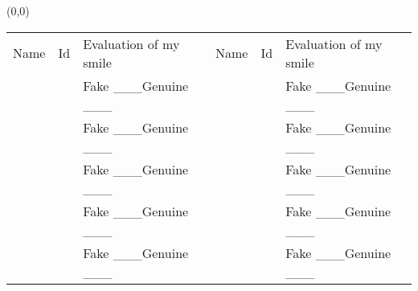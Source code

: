 \documentclass[a4paper]{article}
\newcommand{\mycard}{%
\begin{tabular}[t]{|p{2cm}|p{2cm}|p{4cm}||p{2cm}|p{4cm}|l|}
Name & Id & Evaluation of my smile & Name & Id & Evaluation of my smile \\
 & & Fake \_\_\_Genuine \_\_\_ & & & Fake \_\_\_Genuine \_\_\_ \\
 \hline
 & & Fake \_\_\_Genuine \_\_\_ & & & Fake \_\_\_Genuine \_\_\_ \\
 \hline
 & & Fake \_\_\_Genuine \_\_\_ & & & Fake \_\_\_Genuine \_\_\_ \\
 \hline
 & & Fake \_\_\_Genuine \_\_\_ & & & Fake \_\_\_Genuine \_\_\_ \\
 \hline
 & & Fake \_\_\_Genuine \_\_\_ & & & Fake \_\_\_Genuine \_\_\_ \\
 \hline
\end{tabular}
}
\begin{document}
\begin{textblock}{8}(0,0)
\end{textblock}
\mycard
\end{document}
